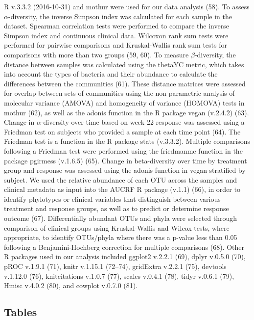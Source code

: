 \documentclass[11pt,]{article}
\begin{document}
R v.3.3.2 (2016-10-31) and mothur were used for our data analysis (58).
To assess \({\alpha}\)-diversity, the inverse Simpson index was
calculated for each sample in the dataset. Spearman correlation tests
were performed to compare the inverse Simpson index and continuous
clinical data. Wilcoxon rank sum tests were performed for pairwise
comparisons and Kruskal-Wallis rank sum tests for comparisons with more
than two groups (59, 60). To measure \({\beta}\)-diversity, the distance
between samples was calculated using the thetaYC metric, which takes
into account the types of bacteria and their abundance to calculate the
differences between the communities (61). These distance matrices were
assessed for overlap between sets of communities using the
non-parametric analysis of molecular variance (AMOVA) and homogeneity of
variance (HOMOVA) tests in mothur (62), as well as the adonis function
in the R package vegan (v.2.4.2) (63). Change in \({\alpha}\)-diversity
over time based on week 22 response was assessed using a Friedman test
on subjects who provided a sample at each time point (64). The Friedman
test is a function in the R package stats (v.3.3.2). Multiple
comparisons following a Friedman test were performed using the
friedmanmc function in the package pgirmess (v.1.6.5) (65). Change in
beta-diversity over time by treatment group and response was assessed
using the adonis function in vegan stratified by subject. We used the
relative abundance of each OTU across the samples and clinical metadata
as input into the AUCRF R package (v.1.1) (66), in order to identify
phylotypes or clinical variables that distinguish between various
treatment and response groups, as well as to predict or determine
response outcome (67). Differentially abundant OTUs and phyla were
selected through comparison of clinical groups using Kruskal-Wallis and
Wilcox tests, where appropriate, to identify OTUs/phyla where there was
a p-value less than 0.05 following a Benjamini-Hochberg correction for
multiple comparisons (68). Other R packages used in our analysis
included ggplot2 v.2.2.1 (69), dplyr v.0.5.0 (70), pROC v.1.9.1 (71),
knitr v.1.15.1 (72--74), gridExtra v.2.2.1 (75), devtools v.1.12.0 (76),
knitcitations v.1.0.7 (77), scales v.0.4.1 (78), tidyr v.0.6.1 (79),
Hmisc v.4.0.2 (80), and cowplot v.0.7.0 (81).

\newpage

\subsection{Tables}\label{tables}
\end{document}
